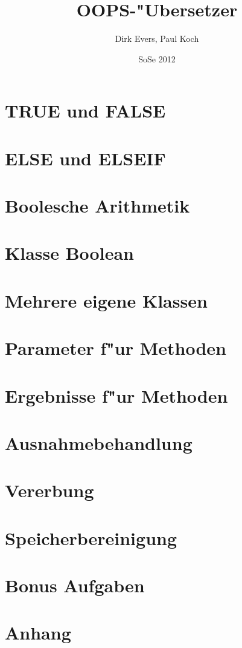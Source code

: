 \documentclass[11pt,a4paper,oneside]{report}
\begin{document}
\title{OOPS-"Ubersetzer}
\date{SoSe 2012}
\author{Dirk Evers, Paul Koch}

\maketitle

\tableofcontents

\chapter{TRUE und FALSE}


\chapter{ELSE und ELSEIF}


\chapter{Boolesche Arithmetik}


\chapter{Klasse Boolean}


\chapter{ Mehrere eigene Klassen}


\chapter{Parameter f"ur Methoden}


\chapter{Ergebnisse f"ur Methoden}


\chapter{Ausnahmebehandlung}


\chapter{Vererbung}


\chapter{Speicherbereinigung}


\chapter{Bonus Aufgaben}

\chapter{Anhang}

\end{document}
